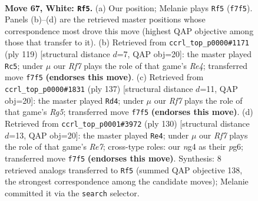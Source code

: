 \documentclass[11pt]{article}
\begin{document}
\clearpage

\begin{figure}[p]\centering
\begin{subfigure}{0.46\textwidth}\centering
\resizebox{\linewidth}{!}{%
\newchessgame
\chessboard[
  setfen={6k1/5R2/1P6/8/P5n1/1K6/7r/8 w - - 7 67},
  showmover=false,
  pgfstyle=straightmove, color=movearrow, markmove={f7-f5}
]}
\caption{}
\end{subfigure}\hfill
\begin{subfigure}{0.46\textwidth}\centering
\resizebox{\linewidth}{!}{%
\newchessgame
\chessboard[
  setfen={6k1/8/8/4r3/5K1p/8/3N4/1R6 b - - 8 60},
  showmover=false,
  pgfstyle=straightmove, color=movearrow, markmove={e5-c5}
]}
\caption{}
\end{subfigure}
\\[4pt]
\begin{subfigure}{0.46\textwidth}\centering
\resizebox{\linewidth}{!}{%
\newchessgame
\chessboard[
  setfen={8/R7/3N2pk/8/6r1/5K2/8/8 b - - 12 69},
  showmover=false,
  pgfstyle=straightmove, color=movearrow, markmove={g4-d4}
]}
\caption{}
\end{subfigure}\hfill
\begin{subfigure}{0.46\textwidth}\centering
\resizebox{\linewidth}{!}{%
\newchessgame
\chessboard[
  setfen={8/4R3/5kp1/8/8/6P1/5K2/1r6 w - - 1 66},
  showmover=false,
  pgfstyle=straightmove, color=movearrow, markmove={e7-e4}
]}
\caption{}
\end{subfigure}
\caption{\textbf{Move 67, White: \texttt{Rf5}.} (a) Our position; Melanie plays \texttt{Rf5} (\texttt{f7f5}). Panels (b)--(d) are the retrieved master positions whose correspondence most drove this move (highest QAP objective among those that transfer to it). (b) Retrieved from \texttt{ccrl\_top\_p0000\#1171} (ply 119) [structural distance $d$=7, QAP obj=20]: the master played \texttt{Rc5}; under $\mu$ our \emph{Rf7} plays the role of that game's \emph{Re4}; transferred move \texttt{f7f5} \textbf{(endorses this move)}. (c) Retrieved from \texttt{ccrl\_top\_p0000\#1831} (ply 137) [structural distance $d$=11, QAP obj=20]: the master played \texttt{Rd4}; under $\mu$ our \emph{Rf7} plays the role of that game's \emph{Rg5}; transferred move \texttt{f7f5} \textbf{(endorses this move)}. (d) Retrieved from \texttt{ccrl\_top\_p0001\#3972} (ply 130) [structural distance $d$=13, QAP obj=20]: the master played \texttt{Re4}; under $\mu$ our \emph{Rf7} plays the role of that game's \emph{Re7}; cross-type roles: our \emph{n}g4 as their \emph{p}g6; transferred move \texttt{f7f5} \textbf{(endorses this move)}. Synthesis: 8 retrieved analogs transferred to \texttt{Rf5} (summed QAP objective 138, the strongest correspondence among the candidate moves); Melanie committed it via the \texttt{search} selector.}
\label{fig:thought-m132}
\end{figure}
\end{document}
